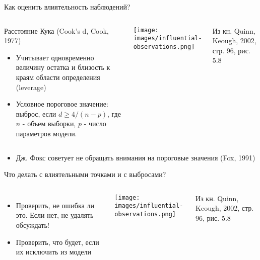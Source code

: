 \documentclass[
  ignorenonframetext,
  t,xcolor=table]{beamer}
\providecommand{\tightlist}{%
  \setlength{\itemsep}{0pt}\setlength{\parskip}{0pt}}
\newcommand{\columnsbegin}{\begin{columns}[T]}
\newcommand{\columnsend}{\end{columns}}
\newcommand{\blockbegin}{\begin{block}}
\newcommand{\blockend}{\end{block}}
\begin{document}
\begin{frame}{Как оценить влиятельность наблюдений?}
\protect\hypertarget{ux43aux430ux43a-ux43eux446ux435ux43dux438ux442ux44c-ux432ux43bux438ux44fux442ux435ux43bux44cux43dux43eux441ux442ux44c-ux43dux430ux431ux43bux44eux434ux435ux43dux438ux439}{}
\columnsbegin
{}

\blockbegin{Расстояние Кука (Cook's d, Cook, 1977)}

\begin{itemize}
\tightlist
\item
  Учитывает одновременно величину остатка и близость к краям области
  определения (leverage)
\item
  Условное пороговое значение: выброс, если \(d \ge 4/(n - p)\), где
  \(n\) - объем выборки, \(p\) - число параметров модели.
\end{itemize}

\blockend


\centering

\texttt{[image: images/influential-observations.png]}

\raggedright

\tiny Из кн. Quinn, Keough, 2002, стр. 96, рис. 5.8

\columnsend

\pause

\begin{itemize}
\tightlist
\item
  Дж. Фокс советует не обращать внимания на пороговые значения (Fox,
  1991)
\end{itemize}
\end{frame}

\begin{frame}{Что делать с влиятельными точками и с выбросами?}
\protect\hypertarget{ux447ux442ux43e-ux434ux435ux43bux430ux442ux44c-ux441-ux432ux43bux438ux44fux442ux435ux43bux44cux43dux44bux43cux438-ux442ux43eux447ux43aux430ux43cux438-ux438-ux441-ux432ux44bux431ux440ux43eux441ux430ux43cux438}{}
\columnsbegin
{}

\begin{itemize}
\tightlist
\item
  Проверить, не ошибка ли это. Если нет, не удалять - обсуждать!
\item
  Проверить, что будет, если их исключить из модели
\end{itemize}


\centering

\texttt{[image: images/influential-observations.png]}

\raggedright

\tiny Из кн. Quinn, Keough, 2002, стр. 96, рис. 5.8

\columnsend
\end{frame}
\end{document}
